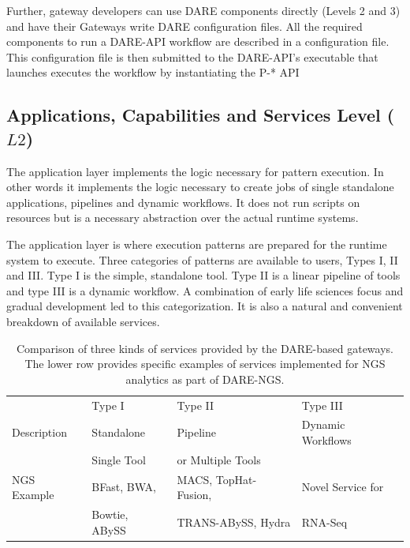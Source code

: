 \documentclass[]{svjour3}
\begin{document}
Further, gateway developers can use DARE components directly (Levels 2 and 3)
and have their Gateways write DARE configuration files.  All the required components to run a
DARE-API workflow are described in  a configuration file. This configuration file is then
submitted to the DARE-API's executable that launches executes the workflow by instantiating the P-* API


\subsection{Applications, Capabilities and Services Level ($L2$)}

The application layer implements the logic necessary for pattern
execution. In other words it implements the logic necessary to
create jobs of single standalone applications, pipelines and
dynamic workflows. It does not run scripts on resources but is
a necessary abstraction over the actual runtime systems. 

The application layer is where execution patterns are prepared for the
runtime system to execute. Three categories of patterns are available
to users, Types I, II and III. Type I is the simple, standalone tool. 
Type II is a linear pipeline of tools and type III is a dynamic workflow.
A combination of early life sciences focus and gradual development
led to this categorization. It is also a natural and convenient
breakdown of available services.


\begin{table}[!h]
\centering
\begin{tabular}{| l | l | l | l |} \hline \rowcolor[rgb]{0.8,0.8,0.8} &
Type I & Type II & Type III \\ Description & Standalone & Pipeline & Dynamic  Workflows\\ 
& Single Tool & or Multiple Tools & \\\hline 
NGS Example & BFast, BWA, & MACS, TopHat-Fusion, &  Novel Service for 
 \\
 & Bowtie, ABySS & TRANS-ABySS, Hydra & RNA-Seq \\
\hline
\end{tabular}
\caption{Comparison of three kinds of services provided by the
 DARE-based gateways. The lower row provides specific examples of
 services implemented for NGS analytics as part of DARE-NGS.}
\label{table:three-type-service}
\end{table}
\end{document}

